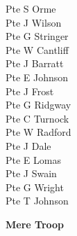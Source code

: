 \begin{multicols}{3}
  Pte S Orme \\
  Pte J Wilson \\
  Pte G Stringer \\
  Pte W Cantliff \\
  Pte J Barratt \\
  Pte E Johnson \\
  Pte J Frost \\
  Pte G Ridgway \\
  Pte C Turnock \\
  Pte W Radford \\
  Pte J Dale \\
  Pte E Lomas \\
  Pte J Swain \\
  Pte G Wright \\
  Pte T Johnson \\
\end{multicols}

\vspace*{10mm}

\begin{center}
  \Large
  \textbf{Mere Troop}
\end{center}

\vspace*{10mm}

